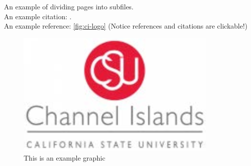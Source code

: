 An example of dividing pages into subfiles.\\
An example citation: \cite{graves-1995}.\\
An example reference: \autoref{fig:ci-logo} (Notice references and citations are clickable!)

\begin{figure}[H]
	\centering
	\includegraphics[width=0.7\linewidth]{media/ci-logo}
	\caption{This is an example graphic}
	\label{fig:ci-logo}
\end{figure}
